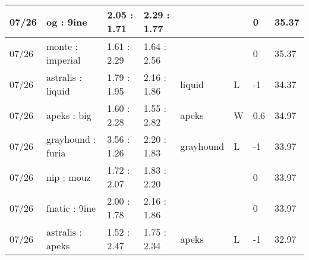 \begin{small}
\begin{longtable}{|l|l|l|l|l|l|l|l|}
	07/26                               & og : 9ine                           & 2.05 : 1.71                             & 2.29 : 1.77                             &                                   &                                   & 0                                    & 35.37                             \\ \hline
	07/26                               & monte : imperial                    & 1.61 : 2.29                             & 1.64 : 2.56                             &                                   &                                   & 0                                    & 35.37                             \\ \hline
	07/26                               & astralis : liquid                   & 1.79 : 1.95                             & 2.16 : 1.86                             & liquid                            & L                                 & -1                                   & 34.37                             \\ \hline
	07/26                               & apeks : big                         & 1.60 : 2.28                             & 1.55 : 2.82                             & apeks                             & W                                 & 0.6                                  & 34.97                             \\ \hline
	07/26                               & grayhound : furia                   & 3.56 : 1.26                             & 2.20 : 1.83                             & grayhound                         & L                                 & -1                                   & 33.97                             \\ \hline
	07/26                               & nip : mouz                          & 1.72 : 2.07                             & 1.83 : 2.20                             &                                   &                                   & 0                                    & 33.97                             \\ \hline
	07/26                               & fnatic : 9ine                       & 2.00 : 1.78                             & 2.16 : 1.86                             &                                   &                                   & 0                                    & 33.97                             \\ \hline
	07/26                               & astralis : apeks                    & 1.52 : 2.47                             & 1.75 : 2.34                             & apeks                             & L                                 & -1                                   & 32.97                             \\ \hline

\end{longtable}
\end{small}
